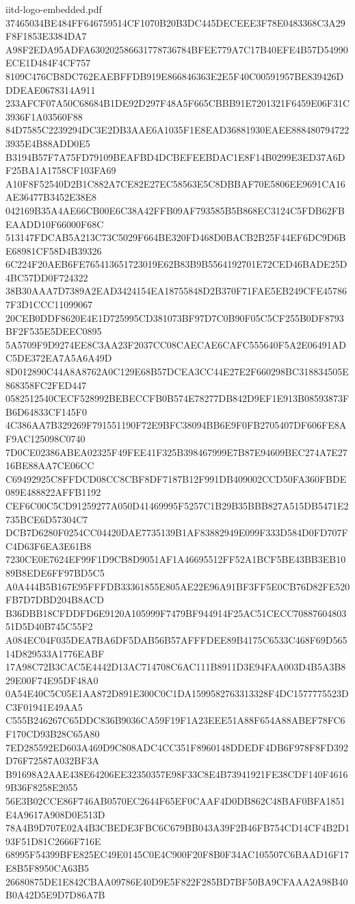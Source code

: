\begin{filecontents*}[overwrite]{iitd-logo-embedded.pdf}
37465034BE484FF646759514CF1070B20B3DC445DECEEE3F78E0483368C3A29F8F1853E3384DA7
A98F2EDA95ADFA630202586631778736784BFEE779A7C17B40EFE4B57D54990ECE1D484F4CF757
8109C476CB8DC762EAEBFFDB919E866846363E2E5F40C00591957BE839426DDDEAE0678314A911
233AFCF07A50C68684B1DE92D297F48A5F665CBBB91E7201321F6459E06F31C3936F1A03560F88
84D7585C2239294DC3E2DB3AAE6A1035F1E8EAD36881930EAEE8884807947223935E4B88ADD0E5
B3194B57F7A75FD79109BEAFBD4DCBEFEEBDAC1E8F14B0299E3ED37A6DF25BA1A1758CF103FA69
A10F8F52540D2B1C882A7CE82E27EC58563E5C8DBBAF70E5806EE9691CA16AE36477B3452E38E8
042169B35A4AE66CB00E6C38A42FFB09AF793585B5B868EC3124C5FDB62FBEAADD10F66000F68C
513147FDCAB5A213C73C5029F664BE320FD468D0BACB2B25F44EF6DC9D6BE68981CF58D4B39326
6C224F20AEB6FE765413651723019E62B83B9B5564192701E72CED46BADE25D4BC57DD0F724322
38B30AAA7D7389A2EAD3424154EA18755848D2B370F71FAE5EB249CFE457867F3D1CCC11099067
20CEB0DDF8620E4E1D725995CD381073BF97D7C0B90F05C5CF255B0DF8793BF2F535E5DEEC0895
5A5709F9D9274EE8C3AA23F2037CC08CAECAE6CAFC555640F5A2E06491ADC5DE372EA7A5A6A49D
8D012890C44A8A8762A0C129E68B57DCEA3CC44E27E2F660298BC318834505E868358FC2FED447
0582512540CECF528992BEBECCFB0B574E78277DB842D9EF1E913B08593873FB6D64833CF145F0
4C386AA7B329269F791551190F72E9BFC38094BB6E9F0FB2705407DF606FE8AF9AC125098C0740
7D0CE02386ABEA02325F49FEE41F325B398467999E7B87E94609BEC274A7E2716BE88AA7CE06CC
C69492925C8FFDCD08CC8CBF8DF7187B12F991DB409002CCD50FA360FBDE089E488822AFFB1192
CEF6C00C5CD91259277A050D41469995F5257C1B29B35BBB827A515DB5471E2735BCE6D57304C7
DCB7D6280F0254CC04420DAE7735139B1AF83882949E099F333D584D0FD707FC4D63F6EA3E61B8
7230CE0E7624EF99F1D9CB8D9051AF1A46695512FF52A1BCF5BE43BB3EB1089B8EDE6FF97BD5C5
A0A444B5B167E95FFFDB33361855E805AE22E96A91BF3FF5E0CB76D82FE520FB7D7DBD204B8ACD
B36DBB18CFDDFD6E9120A105999F7479BF944914F25AC51CECC7088760480351D5D40B745C55F2
A084EC04F035DEA7BA6DF5DAB56B57AFFFDEE89B4175C6533C468F69D56514D829533A1776EABF
17A98C72B3CAC5E4442D13AC714708C6AC111B8911D3E94FAA003D4B5A3B829E00F74E95DF48A0
0A54E40C5C05E1AA872D891E300C0C1DA1599582763313328F4DC1577775523DC3F01941E49AA5
C555B246267C65DDC836B9036CA59F19F1A23EEE51A88F654A88ABEF78FC6F170CD93B28C65A80
7ED285592ED603A469D9C808ADC4CC351F8960148DDEDF4DB6F978F8FD392D76F72587A032BF3A
B91698A2AAE438E64206EE32350357E98F33C8E4B73941921FE38CDF140F46169B36F8258E2055
56E3B02CCE86F746AB0570EC2644F65EF0CAAF4D0DB862C48BAF0BFA1851E4A9617A908D0E513D
78A4B9D707E02A4B3CBEDE3FBC6C679BB043A39F2B46FB754CD14CF4B2D193F51D81C2666F716E
68995F54399BFE825EC49E0145C0E4C900F20F8B0F34AC105507C6BAAD16F17E8B5F8950CA63B5
26680875DE1E842CBAA09786E40D9E5F822F285BD7BF50BA9CFAAA2A98B40B0A42D5E9D7D86A7B

\end{filecontents*}
